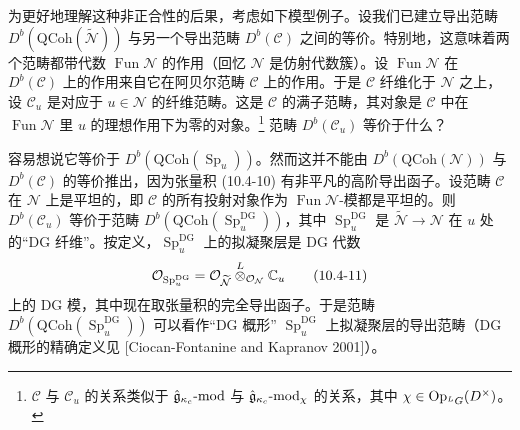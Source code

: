为更好地理解这种非正合性的后果，考虑如下模型例子。设我们已建立导出范畴 $D^b(\mathrm{QCoh}(\widetilde{\mathcal{N}}))$ 与另一个导出范畴 $D^b(\mathcal{C})$ 之间的等价。特别地，这意味着两个范畴都带代数 $\operatorname{Fun}\mathcal{N}$ 的作用（回忆 $\mathcal{N}$ 是仿射代数簇）。设 $\operatorname{Fun}\mathcal{N}$ 在 $D^b(\mathcal{C})$ 上的作用来自它在阿贝尔范畴 $\mathcal{C}$ 上的作用。于是 $\mathcal{C}$ 纤维化于 $\mathcal{N}$ 之上，设 $\mathcal{C}_u$ 是对应于 $u\in\mathcal{N}$ 的纤维范畴。这是 $\mathcal{C}$ 的满子范畴，其对象是 $\mathcal{C}$ 中在 $\operatorname{Fun}\mathcal{N}$ 里 $u$ 的理想作用下为零的对象。\footnote{$\mathcal{C}$ 与 $\mathcal{C}_u$ 的关系类似于 $\hat{\mathfrak{g}}_{\kappa_c}\text{-}\mathrm{mod}$ 与 $\hat{\mathfrak{g}}_{\kappa_c}\text{-}\mathrm{mod}_\chi$ 的关系，其中 $\chi\in\operatorname{Op}_{{}^L G}(D^\times)$。} 范畴 $D^b(\mathcal{C}_u)$ 等价于什么？

容易想说它等价于 $D^b(\mathrm{QCoh}(\operatorname{Sp}_u))$。然而这并不能由 $D^b(\mathrm{QCoh}(\mathcal{N}))$ 与 $D^b(\mathcal{C})$ 的等价推出，因为张量积 (10.4-10) 有非平凡的高阶导出函子。设范畴 $\mathcal{C}$ 在 $\mathcal{N}$ 上是平坦的，即 $\mathcal{C}$ 的所有投射对象作为 $\operatorname{Fun}\mathcal{N}$-模都是平坦的。则 $D^b(\mathcal{C}_u)$ 等价于范畴 $D^b(\mathrm{QCoh}(\operatorname{Sp}_u^{\mathrm{DG}}))$，其中 $\operatorname{Sp}_u^{\mathrm{DG}}$ 是 $\widetilde{\mathcal{N}}\to\mathcal{N}$ 在 $u$ 处的“DG 纤维”。按定义，$\operatorname{Sp}_u^{\mathrm{DG}}$ 上的拟凝聚层是 DG 代数
\begin{equation}
    \mathcal{O}_{\operatorname{Sp}_u^{\mathrm{DG}}}
    =\mathcal{O}_{\widetilde{\mathcal{N}}}\overset{L}{\otimes}_{\mathcal{O}_{\mathcal{N}}}\mathbb{C}_u
    \tag{10.4-11}
\end{equation}
上的 DG 模，其中现在取张量积的完全导出函子。于是范畴 $D^b(\mathrm{QCoh}(\operatorname{Sp}_u^{\mathrm{DG}}))$ 可以看作“DG 概形” $\operatorname{Sp}_u^{\mathrm{DG}}$ 上拟凝聚层的导出范畴（DG 概形的精确定义见 [Ciocan-Fontanine and Kapranov 2001]）。


